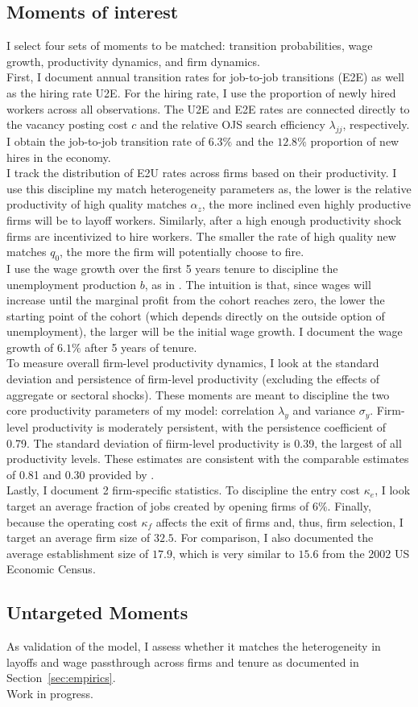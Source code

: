 \subsection{Moments of interest} %
I select four sets of moments to be matched: transition probabilities, wage growth, productivity dynamics, and firm dynamics. \\
First, I document annual transition rates for job-to-job transitions (E2E) as well as the hiring rate U2E. For the hiring rate, I use the proportion of newly hired workers across all observations. The U2E and E2E rates are connected directly to the vacancy posting cost $c$ and the relative OJS search efficiency $\lambda_{jj}$, respectively. I obtain the job-to-job transition rate of $6.3\%$ and the $12.8\%$ proportion of new hires in the economy. \\
I track the distribution of E2U rates across firms based on their productivity. I use this discipline my match heterogeneity parameters as, the lower is the relative productivity of high quality matches $\alpha_z$, the more inclined even highly productive firms will be to layoff workers. Similarly, after a high enough productivity shock firms are incentivized to hire workers. The smaller the rate of high quality new matches $q_0$, the more the firm will potentially choose to fire. \\
I use the wage growth over the first 5 years tenure to discipline the unemployment production $b$, as in \textcite{souchier2022}. The intuition is that, since wages will increase until the marginal profit from the cohort reaches zero, the lower the starting point of the cohort (which depends directly on the outside option of unemployment), the larger will be the initial wage growth. I document the wage growth of $6.1\%$ after 5 years of tenure. \\ %
To measure overall firm-level productivity dynamics, I look at the standard deviation and persistence of firm-level productivity (excluding the effects of aggregate or sectoral shocks). These moments are meant to discipline the two core productivity parameters of my model: correlation $\lambda_y$ and variance $\sigma_y$. Firm-level productivity is moderately persistent, with the persistence coefficient of 0.79. The standard deviation of fiirm-level productivity is 0.39, the largest of all productivity levels. These estimates are consistent with the comparable estimates of 0.81 and 0.30 provided by \textcite{souchier2022}.\\
Lastly, I document 2 firm-specific statistics. To discipline the entry cost $\kappa_e$, I look target an average fraction of jobs created by opening firms of $6\%$. Finally, because the operating cost $\kappa_f$ affects the exit of firms and, thus, firm selection, I target an average firm size of $32.5$. For comparison, I also documented the average establishment size of $17.9$, which is very similar to $15.6$ from the 2002 US Economic Census. 

\subsection{Untargeted Moments}
As validation of the model, I assess whether it matches the heterogeneity in layoffs and wage passthrough across firms and tenure as documented in Section~\ref{sec:empirics}. \\
Work in progress.
